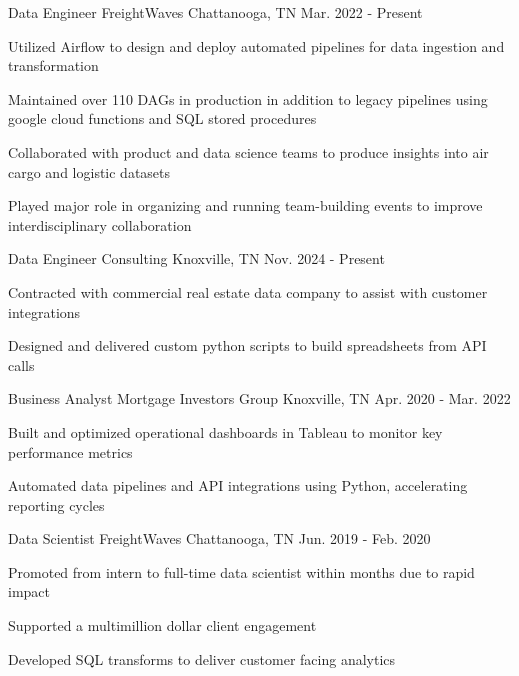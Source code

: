
\begin{cventries}
  \cventry
    {Data Engineer} %
    {FreightWaves} %
    {Chattanooga, TN} %
    {Mar. 2022 - Present} %
    {
      \begin{cvitems} %
        \item {Utilized Airflow to design and deploy automated pipelines for data ingestion and transformation}
        \item {Maintained over 110 DAGs in production in addition to legacy pipelines using google cloud functions and SQL stored procedures }
        \item {Collaborated with product and data science teams to produce insights into air cargo and logistic datasets}
        \item {Played major role in organizing and running team-building events to improve interdisciplinary collaboration}
      \end{cvitems}
    }
  
  \cventry
      {Data Engineer}
      {Consulting}
      {Knoxville, TN}
      {Nov. 2024 - Present}
      {
        \begin{cvitems}
          \item {Contracted with commercial real estate data company to assist with customer integrations }
          \item {Designed and delivered custom python scripts to build spreadsheets from API calls}
        \end{cvitems}
      }
      
  \cventry
    {Business Analyst} %
    {Mortgage Investors Group} %
    {Knoxville, TN} %
    {Apr. 2020 - Mar. 2022} %
    {
      \begin{cvitems} %
        \item Built and optimized operational dashboards in Tableau to monitor key performance metrics
        \item Automated data pipelines and API integrations using Python, accelerating reporting cycles
      \end{cvitems}
    }
    
  \cventry
    {Data Scientist} %
    {FreightWaves} %
    {Chattanooga, TN} %
    {Jun. 2019 - Feb. 2020} %
    {
      \begin{cvitems} %
        \item {Promoted from intern to full-time data scientist within months due to rapid impact}
        \item {Supported a multimillion dollar client engagement}
        \item {Developed SQL transforms to deliver customer facing analytics}
      \end{cvitems}
    }

\end{cventries}
